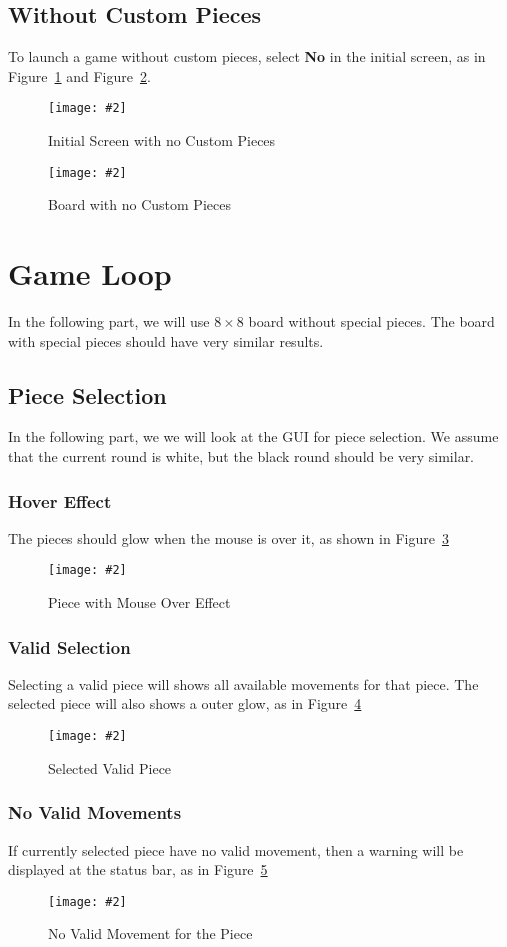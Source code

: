 \documentclass[12pt]{article}
\newcommand{\img}[3]{
\begin{figure}[!ht]
\begin{center}
\texttt{[image: \#2]}
\caption{#3}\label{#2}
\end{center}
\end{figure}
}
\newcommand{\B}[1]{\textbf{#1}}
\begin{document}
\subsection{Without Custom Pieces}
To launch a game without custom pieces, select \B{No} in the initial screen, as in Figure~\ref{init_no_custom} and Figure~\ref{board_no_custom}.
\img{0.7}{init_no_custom}{Initial Screen with no Custom Pieces}
\img{0.45}{board_no_custom}{Board with no Custom Pieces}


\section{Game Loop}

In the following part, we will use $8\times8$ board without special pieces. The board with special pieces should have very similar results.

\subsection{Piece Selection}
In the following part, we we will look at the GUI for piece selection. We assume that the current round is white, but the black round should be very similar.

\subsubsection{Hover Effect}
The pieces should glow when the mouse is over it, as shown in Figure~\ref{board_hover}
\img{0.4}{board_hover}{Piece with Mouse Over Effect}

\subsubsection{Valid Selection}
Selecting a valid piece will shows all available movements for that piece. The selected piece will also shows a outer glow, as in Figure~\ref{board_select_piece}
\img{0.4}{board_select_piece}{Selected Valid Piece}


\subsubsection{No Valid Movements}
If currently selected piece have no valid movement, then a warning will be displayed at the status bar, as in Figure~\ref{board_no_movement}
\img{0.4}{board_no_movement}{No Valid Movement for the Piece}
\end{document}
